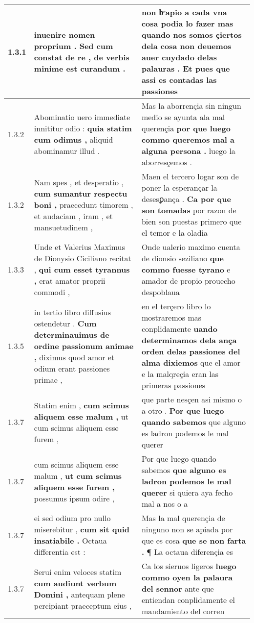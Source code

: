 \begin{tabular}{|p{1cm}|p{6.5cm}|p{6.5cm}|}
1.3.1 & inuenire nomen proprium . \textbf{ Sed cum constat de re , } de verbis minime est curandum . & non bͤapio a cada vna cosa podia lo fazer \textbf{ mas quando nos somos çiertos dela cosa non deuemos auer cuydado delas palauras . } Et pues que assi es contadas las passiones \\\hline
1.3.2 & Abominatio uero immediate innititur odio : \textbf{ quia statim cum odimus , } aliquid abominamur illud . & Mas la aborrençia sin ningun medio se ayunta ala mal querençia \textbf{ por que luego commo queremos mal a alguna persona . } luego la aborresçemos . \\\hline
1.3.2 & Nam spes , et desperatio , \textbf{ cum sumantur respectu boni , } praecedunt timorem , et audaciam , iram , et mansuetudinem , & Maen el tercero logar son de poner la esperançar la desesꝑança . \textbf{ Ca por que son tomadas } por razon de bien son puestas primero que el temor e la oladia \\\hline
1.3.3 & Unde et Valerius Maximus de Dionysio Ciciliano recitat , \textbf{ qui cum esset tyrannus , } erat amator proprii commodi , & Onde ualerio maximo cuenta de dionsio seziliano \textbf{ que commo fuesse tyrano } e amador de propio prouecho despoblaua \\\hline
1.3.5 & in tertio libro diffusius ostendetur . \textbf{ Cum determinauimus de ordine passionum animae , } diximus quod amor et odium erant passiones primae , & en el terçero libro lo mostraremos mas conplidamente \textbf{ uando determinamos dela ança orden delas passiones del alma dixiemos } que el amor e la malqreçia eran las primeras passiones \\\hline
1.3.7 & Statim enim , \textbf{ cum scimus aliquem esse malum , } ut cum scimus aliquem esse furem , & que parte nesçen asi mismo o a otro . \textbf{ Por que luego quando sabemos } que alguno es ladron podemos le mal querer \\\hline
1.3.7 & cum scimus aliquem esse malum , \textbf{ ut cum scimus aliquem esse furem , } possumus ipsum odire , & Por que luego quando sabemos \textbf{ que alguno es ladron podemos le mal querer } si quiera aya fecho mal a nos o a \\\hline
1.3.7 & ei sed odium pro nullo miserebitur , \textbf{ cum sit quid insatiabile . } Octaua differentia est : & Mas la mal querençia de ninguno non se apiada por que es cosa \textbf{ que se non farta . } ¶ La octaua diferençia es \\\hline
1.3.7 & Serui enim veloces statim \textbf{ cum audiunt verbum Domini , } antequam plene percipiant praeceptum eius , & Ca los sieruos ligeros \textbf{ luego commo oyen la palaura del sennor } ante que entiendan conplidamente el mandamiento del corren \\\hline

\end{tabular}
